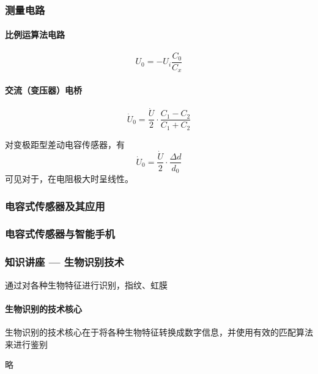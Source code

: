 \documentclass[11pt]{article}
\begin{document}
\subsubsection{测量电路}%
\label{ssub:ce_liang_dian_lu_}

\paragraph{比例运算法电路}%
\label{par:bi_li_yun_suan_fa_dian_lu_}

$$
U_0 = -U_i \frac{C_0}{C_x} 
$$

\paragraph{交流（变压器）电桥}%
\label{par:jiao_liu_bian_ya_qi_dian_qiao_}

$$
   \dot U_0 = \frac{\dot U}{2} \cdot \frac{C_1 - C_2}{C_1 + C_2} 
$$

对变极距型差动电容传感器，有
$$
   \dot U_0 = \frac{\dot U}{2} \cdot \frac{\Delta d}{d_0} 
$$
可见对于，在电阻极大时呈线性。

\subsubsection{电容式传感器及其应用}%
\label{ssub:dian_rong_shi_chuan_gan_qi_ji_qi_ying_yong_}

\subsubsection{电容式传感器与智能手机}%
\label{ssub:dian_rong_shi_chuan_gan_qi_yu_zhi_neng_shou_ji_}

\subsubsection{知识讲座 --- 生物识别技术}%
\label{ssub:subsubsection_namezhi_shi_jiang_zuo_sheng_wu_shi_bie_ji_zhu_}

通过对各种生物特征进行识别，指纹、虹膜

\paragraph{生物识别的技术核心}%
\label{par:sheng_wu_shi_bie_de_ji_zhu_he_xin_}

生物识别的技术核心在于将各种生物特征转换成数字信息，并使用有效的匹配算法来进行鉴别

略
\end{document}
